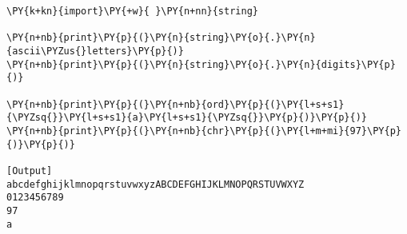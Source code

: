 \begin{Verbatim}[label=\makebox{\href{https://github.com/unipi-physics-labs/lab1-notes/tree/main/snippy/ascii.py}{https://github.com/.../ascii.py}},commandchars=\\\{\}]
\PY{k+kn}{import}\PY{+w}{ }\PY{n+nn}{string}

\PY{n+nb}{print}\PY{p}{(}\PY{n}{string}\PY{o}{.}\PY{n}{ascii\PYZus{}letters}\PY{p}{)}
\PY{n+nb}{print}\PY{p}{(}\PY{n}{string}\PY{o}{.}\PY{n}{digits}\PY{p}{)}

\PY{n+nb}{print}\PY{p}{(}\PY{n+nb}{ord}\PY{p}{(}\PY{l+s+s1}{\PYZsq{}}\PY{l+s+s1}{a}\PY{l+s+s1}{\PYZsq{}}\PY{p}{)}\PY{p}{)}
\PY{n+nb}{print}\PY{p}{(}\PY{n+nb}{chr}\PY{p}{(}\PY{l+m+mi}{97}\PY{p}{)}\PY{p}{)}

[Output]
abcdefghijklmnopqrstuvwxyzABCDEFGHIJKLMNOPQRSTUVWXYZ
0123456789
97
a
\end{Verbatim}
